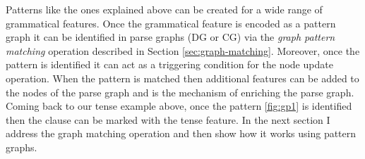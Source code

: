    

    Patterns like the ones explained above can be created for a wide range of grammatical features. Once the grammatical feature is encoded as a pattern graph it can be identified in parse graphs (DG or CG) via the \textit{graph pattern matching} operation described in Section \ref{sec:graph-matching}. Moreover, once the pattern is identified it can act as a triggering condition for the node update operation. When the pattern is matched then additional features can be added to the nodes of the parse graph and is the mechanism of enriching the parse graph. Coming back to our tense example above, once the pattern \ref{fig:gp1} is identified then the clause can be marked with the tense feature. In the next section I address the graph matching operation and then show how it works using pattern graphs. 


